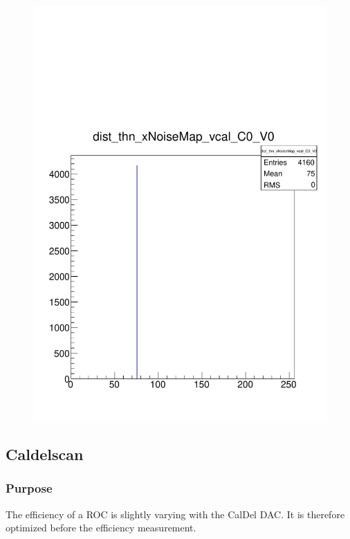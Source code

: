 \documentclass[a4paper,12pt,twoside]{article}
\begin{document}
\begin{figure} [h!]
\begin{minipage}{.48\textwidth}
  \includegraphics[width=\textwidth]{./Figures/HRSCurves_thnDist.pdf}
  \label{HRSCurves-thnDist}
\end{minipage}
\end{figure}



\subsection{Caldelscan}

\subsubsection{Purpose}
The efficiency of a ROC is slightly varying with the CalDel DAC. It is therefore optimized before the efficiency measurement.
\end{document}
